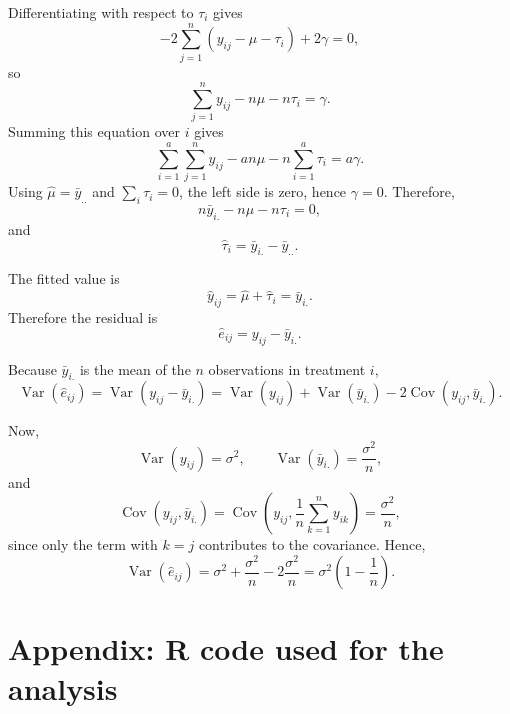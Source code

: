 \documentclass[11pt,a4paper]{article}
\begin{document}
Differentiating with respect to $\tau_i$ gives
\[
-2\sum_{j=1}^n (y_{ij}-\mu-\tau_i)+2\gamma=0,
\]
so
\[
\sum_{j=1}^n y_{ij}-n\mu-n\tau_i=\gamma.
\]
Summing this equation over $i$ gives
\[
\sum_{i=1}^a\sum_{j=1}^n y_{ij}-an\mu-n\sum_{i=1}^a\tau_i = a\gamma.
\]
Using $\hat{\mu}=\bar{y}_{..}$ and $\sum_i \tau_i=0$, the left side is zero, hence $\gamma=0$. Therefore,
\[
n\bar{y}_{i.}-n\mu-n\tau_i=0,
\]
and
\[
\hat{\tau}_i=\bar{y}_{i.}-\bar{y}_{..}.
\]

The fitted value is
\[
\hat{y}_{ij}=\hat{\mu}+\hat{\tau}_i=\bar{y}_{i.}.
\]
Therefore the residual is
\[
\hat{e}_{ij}=y_{ij}-\bar{y}_{i.}.
\]

Because $\bar{y}_{i.}$ is the mean of the $n$ observations in treatment $i$,
\[
\operatorname{Var}(\hat{e}_{ij})
= \operatorname{Var}(y_{ij}-\bar{y}_{i.})
= \operatorname{Var}(y_{ij})+\operatorname{Var}(\bar{y}_{i.})
-2\operatorname{Cov}(y_{ij},\bar{y}_{i.}).
\]

Now,
\[
\operatorname{Var}(y_{ij})=\sigma^2,\qquad
\operatorname{Var}(\bar{y}_{i.})=\frac{\sigma^2}{n},
\]
and
\[
\operatorname{Cov}(y_{ij},\bar{y}_{i.})
=\operatorname{Cov}\left(y_{ij},\frac{1}{n}\sum_{k=1}^n y_{ik}\right)
=\frac{\sigma^2}{n},
\]
since only the term with $k=j$ contributes to the covariance. Hence,
\[
\operatorname{Var}(\hat{e}_{ij})
= \sigma^2+\frac{\sigma^2}{n}-2\frac{\sigma^2}{n}
= \sigma^2\left(1-\frac{1}{n}\right).
\]

\newpage
\appendix
\section*{Appendix: R code used for the analysis}


\end{document}
